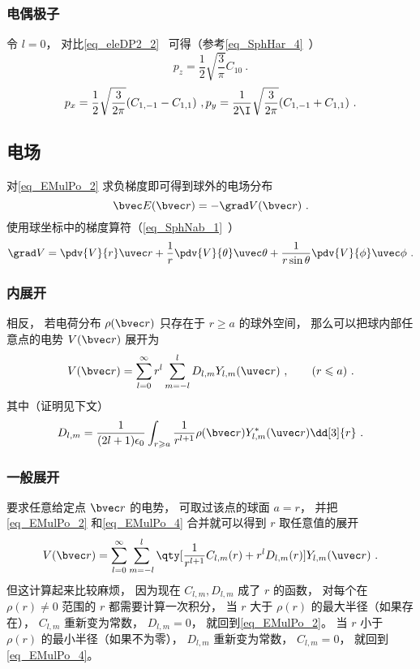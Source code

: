 \subsubsection{电偶极子}
令 $l=0$， 对比\autoref{eq_eleDP2_2}~ 可得（参考\autoref{eq_SphHar_4}~）
\begin{equation} %
p_z = \frac12\sqrt{\frac{3}{\pi}} C_{10}~.
\end{equation}
\begin{equation}
p_x = \frac12\sqrt{\frac{3}{2\pi}} (C_{1,-1}-C_{1,1})~, \quad\\
p_y = \frac{1}{2\I}\sqrt{\frac{3}{2\pi}} (C_{1,-1}+C_{1,1})~.
\end{equation}

\subsection{电场}
对\autoref{eq_EMulPo_2} 求负梯度即可得到球外的电场分布
\begin{equation}
\bvec E(\bvec r) = -\grad V(\bvec r)~.
\end{equation}
使用球坐标中的梯度算符（\autoref{eq_SphNab_1}~）
\begin{equation}
\grad V = \pdv{V}{r}\uvec r + \frac{1}{r} \pdv{V}{\theta}\uvec \theta  + \frac{1}{r\sin \theta }\pdv{V}{\phi}\uvec \phi~.
\end{equation}

\subsubsection{内展开}
相反， 若电荷分布 $\rho(\bvec r)$ 只存在于 $r \geqslant a$ 的球外空间， 那么可以把球内部任意点的电势 $V(\bvec r)$ 展开为
\begin{equation}\label{eq_EMulPo_4}
V(\bvec r) = \sum_{l = 0}^\infty r^l \sum_{m = -l}^l D_{l,m} Y_{l,m}(\uvec r)~, \qquad (r \leqslant a)~.
\end{equation}
其中（证明见下文）
\begin{equation}\label{eq_EMulPo_3}
D_{l,m} = \frac{1}{(2l+1)\epsilon_0} \int_{r\geqslant a} \frac{1}{r^{l+1}} \rho(\bvec r) Y_{l,m}^*(\uvec r) \dd[3]{r}~.
\end{equation}

\subsubsection{一般展开}
要求任意给定点 $\bvec r$ 的电势， 可取过该点的球面 $a = r$， 并把\autoref{eq_EMulPo_2} 和\autoref{eq_EMulPo_4} 合并就可以得到 $r$ 取任意值的展开
\begin{equation}
V(\bvec r) = \sum_{l = 0}^\infty\sum_{m = -l}^l \qty[\frac{1}{r^{l+1}} C_{l,m}(r) + r^l D_{l,m}(r)] Y_{l,m}(\uvec r)~.
\end{equation}
但这计算起来比较麻烦， 因为现在 $C_{l,m}, D_{l,m}$ 成了 $r$ 的函数， 对每个在 $\rho(r)\ne 0$ 范围的 $r$ 都需要计算一次积分， 当 $r$ 大于 $\rho(r)$ 的最大半径（如果存在）， $C_{l,m}$ 重新变为常数， $D_{l,m}= 0$， 就回到\autoref{eq_EMulPo_2}。 当 $r$ 小于 $\rho(r)$ 的最小半径（如果不为零）， $D_{l,m}$ 重新变为常数， $C_{l,m} = 0$， 就回到\autoref{eq_EMulPo_4}。

